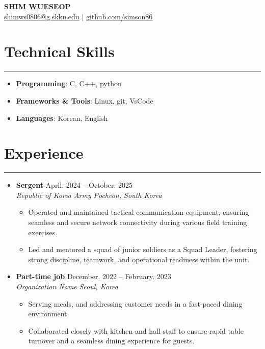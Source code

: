 \documentclass[letterpaper, 10pt]{article}
\begin{document}
\begin{center}
 \textbf{\LARGE SHIM WUESEOP} \\ \vspace{2pt}
 \href{mailto:your@g.skku.edu}{\underline{shimws0806@g.skku.edu}} $|$
 \href{https://github.com/yourid}{\underline{github.com/simson86}}
\end{center}
\section*{Technical Skills}
\hrule
\vspace{4pt}
\begin{itemize}
 \item[] \textbf{Programming}: C, C++, python%
 \item[] \textbf{Frameworks \& Tools}: Linux, git, VsCode %
 \item[] \textbf{Languages}: Korean, English%
\end{itemize}
\section*{Experience}
\hrule
\vspace{4pt}
\begin{itemize}
 \item[]
 \textbf{Sergent} \hfill April. 2024 -- October. 2025 \\ %
 \textit{Republic of Korea Army} \hfill \textit{Pocheon, South Korea}
 \begin{itemize}
 \item Operated and maintained tactical communication equipment, ensuring seamless and secure network connectivity during various field training exercises.
 \item Led and mentored a squad of junior soldiers as a Squad Leader, fostering strong discipline, teamwork, and operational readiness within the unit.
 \end{itemize}
 \item[]
 \textbf{Part-time job} \hfill December. 2022 -- February. 2023 \\ %
 \textit{Organization Name} \hfill \textit{Seoul, Korea}
 \begin{itemize}
 \item Serving meals, and addressing customer needs in a fast-paced dining environment.
 \item Collaborated closely with kitchen and hall staff to ensure rapid table turnover and a seamless dining experience for guests.
 \end{itemize}
\end{itemize}
\end{document}
